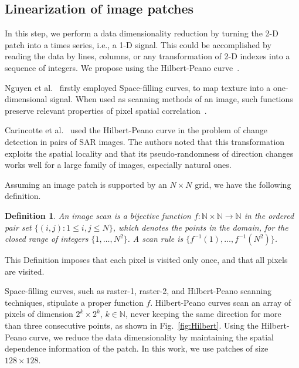 \documentclass[journal]{IEEEtran}
\begin{document}
\subsection{Linearization of image patches}\label{linearization}

In this step, we perform a data dimensionality reduction by turning the 2-D patch into a times series, i.e., a 1-D signal.
This could be accomplished by reading the data by lines, columns, or any transformation of 2-D indexes into a sequence of integers.
We propose using the Hilbert-Peano curve~\cite{Lee1994Texture}.

Nguyen et al.~\cite{nguyen1982space} firstly employed Space-filling curves,
to map texture into a one-dimensional signal.
When used as scanning methods of an image, such functions preserve relevant properties of pixel spatial correlation~\cite{Lee1994Texture}.

Carincotte et al.~\cite{UnsupervisedChangeDetectiononSARImagesUsingFuzzyHiddenMarkovChains} used the Hilbert-Peano curve in the problem of change detection in pairs of SAR images.
The authors noted that this transformation exploits the spatial locality and that its pseudo-randomness
of direction changes works well for a large family of images, especially
natural ones.

Assuming an image patch is supported by an $N \times N$ grid, we have the following definition.

\newtheorem{mydef}{Definition}
\begin{mydef}
   An image scan is a bijective function $f \colon \mathbb{N} \times \mathbb{N} \to \mathbb{N}$ in the ordered pair set $ \{(i, j): 1 \leq i , j \leq N \}$, which denotes the points in the domain, for the closed range of integers $\{1, \dots, N^2\}$.
   A scan rule is $\{f^{-1}(1), \dots, f^{-1}(N^2)\}$.
   \label{def:CurveFilling}
\end{mydef}
This Definition imposes that each pixel is visited only once, and that all pixels are visited.

Space-filling curves, such as raster-1, raster-2, and Hilbert-Peano scanning techniques, stipulate a proper function $f$.
Hilbert-Peano curves scan an array of pixels of dimension $2^k \times 2^k$, $k \in \mathbb{N}$, never keeping the same direction for more than three consecutive points, as shown in Fig.~\ref{fig:Hilbert}.
Using the Hilbert-Peano curve, we reduce the data dimensionality by maintaining the spatial dependence information of the patch.
In this work, we use patches of size $128 \times 128$.
\end{document}
